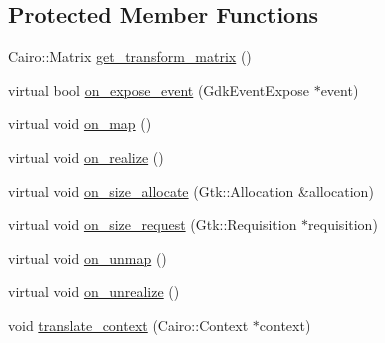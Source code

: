 \subsection*{Protected Member Functions}
\begin{DoxyCompactItemize}
\item 
Cairo::Matrix \hyperlink{classGtk_1_1Plot_1_1Area_ae10eac569e8477756e0bdafdecdc4666}{get\_\-transform\_\-matrix} ()
\item 
virtual bool \hyperlink{classGtk_1_1Plot_1_1Area_a5595741f965885c6c621ac2129d9ae34}{on\_\-expose\_\-event} (GdkEventExpose $\ast$event)
\item 
virtual void \hyperlink{classGtk_1_1Plot_1_1Area_aac03d26cdb161ccc33f34ef3dbcf428a}{on\_\-map} ()
\item 
virtual void \hyperlink{classGtk_1_1Plot_1_1Area_acbcedd50e5503b656e14307c01569500}{on\_\-realize} ()
\item 
virtual void \hyperlink{classGtk_1_1Plot_1_1Area_a29ff37fa1a94277109a514bcbf90ac16}{on\_\-size\_\-allocate} (Gtk::Allocation \&allocation)
\item 
virtual void \hyperlink{classGtk_1_1Plot_1_1Area_a839dd99ca3281e3f6b7c669af54d1393}{on\_\-size\_\-request} (Gtk::Requisition $\ast$requisition)
\item 
virtual void \hyperlink{classGtk_1_1Plot_1_1Area_a67389087dd5c6467a3ae9241521f80bf}{on\_\-unmap} ()
\item 
virtual void \hyperlink{classGtk_1_1Plot_1_1Area_a301b7923090d5b717d3112fc339dce01}{on\_\-unrealize} ()
\item 
void \hyperlink{classGtk_1_1Plot_1_1Area_a2be35b990f15d351739af58119d5e7a9}{translate\_\-context} (Cairo::Context $\ast$context)
\end{DoxyCompactItemize}
